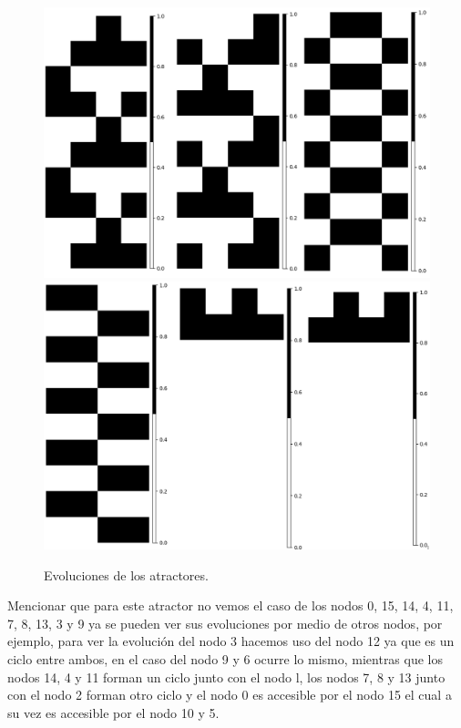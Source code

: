 \documentclass[11pt]{article}
\begin{document}
			\begin{figure}[H]
			\centering
			\includegraphics[scale=0.3]{resources/Atractores54/atractor_54_size_4_res.png}
			\includegraphics[scale=0.3]{resources/Atractores54/atractor_54_size_4_res1.png}
			\caption{Evoluciones de los atractores.}\label{fig:picture}
			\end{figure}
			Mencionar que para este atractor no vemos el caso de los nodos 0, 15, 14, 4, 11, 7, 8, 13, 3 y 9 ya se pueden ver sus evoluciones por medio de otros nodos, por ejemplo, para ver la evolución del nodo 3 hacemos uso del nodo 12 ya que es un ciclo entre ambos, en el caso del nodo 9 y 6 ocurre lo mismo, mientras que los nodos 14, 4 y 11 forman un ciclo junto con el nodo l, los nodos 7, 8 y 13 junto con el nodo 2 forman otro ciclo y el nodo 0 es accesible por el nodo 15 el cual a su vez es accesible por el nodo 10 y 5.
				
\end{document}
